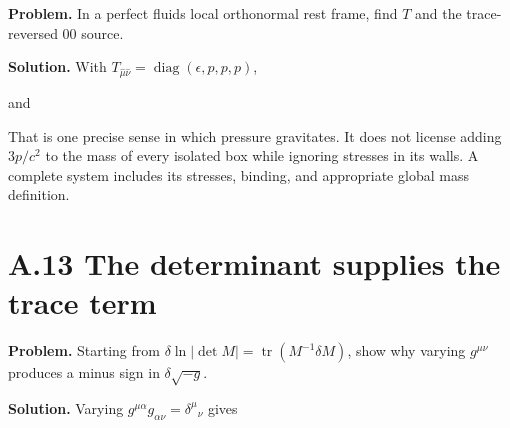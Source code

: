 \documentclass[
  11pt,
  letterpaper,
  oneside,
  openany]{scrbook}
\begin{document}
\textbf{Problem.} In a perfect fluid\textquotesingle s local orthonormal
rest frame, find \(T\) and the trace-reversed \(00\) source.

\textbf{Solution.} With
\(T_{\hat\mu\hat\nu}=\operatorname{diag}(\epsilon,p,p,p)\),

\begin{center}
\begingroup
{}
\ifdim\wd\grmathbox>\linewidth
\resizebox{\linewidth}{!}{\usebox{\grmathbox}}
\else\usebox{\grmathbox}\fi
\endgroup
\end{center}

and

\begin{center}
\begingroup
{}
\ifdim\wd\grmathbox>\linewidth
\resizebox{\linewidth}{!}{\usebox{\grmathbox}}
\else\usebox{\grmathbox}\fi
\endgroup
\end{center}

That is one precise sense in which pressure gravitates. It does not
license adding \(3p/c^2\) to the mass of every isolated box while
ignoring stresses in its walls. A complete system includes its stresses,
binding, and appropriate global mass definition.

\hypertarget{a.13-the-determinant-supplies-the-trace-term}{%
\section{A.13 The determinant supplies the trace
term}\label{a.13-the-determinant-supplies-the-trace-term}}

\textbf{Problem.} Starting from
\(\delta\ln|\det M|=\operatorname{tr}(M^{-1}\delta M)\), show why
varying \(g^{\mu\nu}\) produces a minus sign in \(\delta\sqrt{-g}\).

\textbf{Solution.} Varying
\(g^{\mu\alpha}g_{\alpha\nu}=\delta^\mu{}_\nu\) gives

\begin{center}
\begingroup
{}
\ifdim\wd\grmathbox>\linewidth
\resizebox{\linewidth}{!}{\usebox{\grmathbox}}
\else\usebox{\grmathbox}\fi
\endgroup
\end{center}
\end{document}
